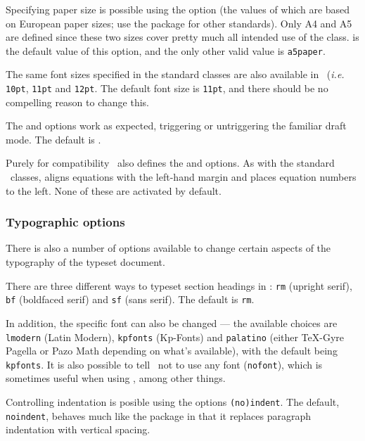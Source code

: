 \documentclass{skdoc}
\begin{document}
	Specifying paper size is possible using the  option
	(the values of which are based
	on European paper sizes; use the  package for other
	standards). Only A4 and A5 are defined since these two sizes cover
	pretty much all intended use of the class.  is the
	default value of this option, and the only other valid value is
	\texttt{a5paper}.

	The same font sizes specified in the standard classes are also
	available in \thepackage\ (\emph{i.e.} \texttt{10pt},
	\texttt{11pt} and \texttt{12pt}. The default font size is
	\texttt{11pt}, and there should be no compelling reason to change
	this.

	The  and  options work as expected, triggering
	or untriggering the familiar draft mode. The default is .

	Purely for compatibility \thepackage\ also defines the 
	and  options. As with the standard \LaTeXe\ classes,
	 aligns equations with the left-hand margin and
	 places equation numbers to the left. None of these
	are activated by default.

	\subsubsection{Typographic options}
	There is also a number of options available to change certain
	aspects of the typography of the typeset document.

	There are three different ways to typeset section headings in
	\thepackage: \texttt{rm} (upright serif), \texttt{bf} (boldfaced
	serif) and \texttt{sf} (sans serif). The default is \texttt{rm}.

	In addition, the specific font can also be changed --- the available
	choices are \texttt{lmodern} (Latin Modern), \texttt{kpfonts}
	(Kp-Fonts) and \texttt{palatino} (either \TeX-Gyre Pagella or
	Pazo Math depending on what's available), with the default being
	\texttt{kpfonts}. It is also possible to tell \thepackage\ not
	to use any font (\texttt{nofont}), which is sometimes useful
	when using , among other things.

	Controlling indentation is posible using the options
	\texttt{(no)indent}. The default, \texttt{noindent}, behaves
	much like the  package in that it replaces
	paragraph indentation with vertical spacing.
\end{document}
